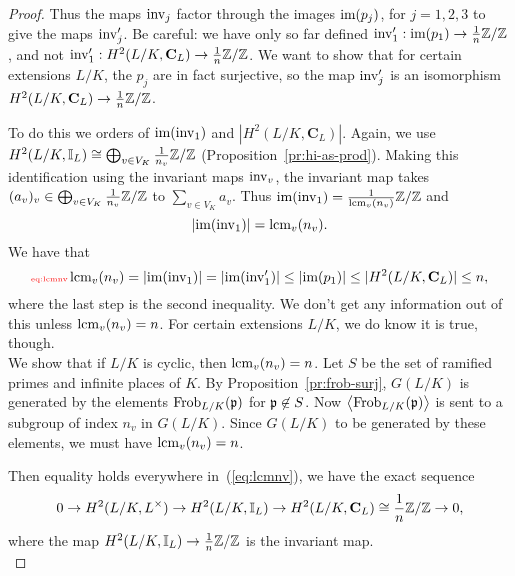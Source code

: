 \begin{proof}
Thus the maps $\operatorname{inv}_j$ factor through the images $\text{im}(p_j)$, for $j=1,2,3$ to give the maps $\operatorname{inv}_j'$. Be careful: we have only so far defined $\operatorname{inv}_1':\text{im}(p_1)\to \frac{1}{n}\mathbb{Z}/\mathbb{Z}$, and not $\operatorname{inv}_1':H^2(L/K,\mathbf C_L)\to \frac{1}{n}\mathbb{Z}/\mathbb{Z}$. %
We want to show that for certain extensions $L/K$, the $p_j$ are in fact surjective, so the map $\operatorname{inv}_j'$ is an isomorphism $H^2(L/K,\mathbf C_L)\to \frac{1}{n}\mathbb{Z}/\mathbb{Z}$. %

To do this we orders of $\text{im}(\operatorname{inv}_1)$ and $|H^2(L/K,\mathbf C_L)|$. Again, we use $H^2(L/K,\mathbb{I}_L)\cong \bigoplus_{v\in V_K}\frac{1}{n_v}\mathbb{Z}/\mathbb{Z}$ (Proposition~\ref{pr:hi-as-prod}). Making this identification using the invariant maps $\operatorname{inv}_v$, the invariant map takes $(a_v)_v\in \bigoplus_{v\in V_K}\frac{1}{n_v}\mathbb{Z}/\mathbb{Z}$ to $\sum_{v\in V_K} a_v$. Thus
$\text{im}(\operatorname{inv}_1)=\frac{1}{\operatorname{lcm}_v(n_v)}\mathbb{Z}/\mathbb{Z}$ and 
\[
|\text{im}(\operatorname{inv}_1)|=\operatorname{lcm}_v(n_v).
\]
We have that 
\begin{equation}\llabel{eq:lcmnv}
\lcm_v(n_v)=|\im(\inv_1)|=|\im(\inv_1')|\le |\im(p_1)|\le |H^2(L/K,\mathbf C_L)|\le n,
\end{equation}
where the last step is the second inequality. 
We don't get any information out of this unless $\operatorname{lcm}_v(n_v)=n$. For certain extensions $L/K$, we do know it is true, though.\\ %

 We show that if $L/K$ is cyclic, then $\operatorname{lcm}_v(n_v)=n$. Let $S$ be the set of ramified primes and infinite places of $K$. By Proposition~\ref{pr:frob-surj}, $G(L/K)$ is generated by the elements $\operatorname{Frob}_{L/K}(\mathfrak{p})$ for $\mathfrak{p}\not\in S$. Now $\left\langle {\operatorname{Frob}_{L/K}(\mathfrak{p})}\right\rangle$ is sent to a subgroup of index $n_v$ in $G(L/K)$. Since $G(L/K)$ to be generated by these elements, we must have $\operatorname{lcm}_v(n_v)=n$.

Then equality holds everywhere in~(\ref{eq:lcmnv}), we have the exact sequence
\[
0\to H^2(L/K,L^{\times})\to H^2(L/K,\mathbb{I}_L)\to H^2(L/K,\mathbf C_L)\cong \frac{1}{n}\mathbb{Z}/\mathbb{Z} \to 0,
\]
where the map $H^2(L/K,\mathbb{I}_L)\to \frac{1}{n}\mathbb{Z}/\mathbb{Z}$ is the invariant map.\\


\end{proof}
